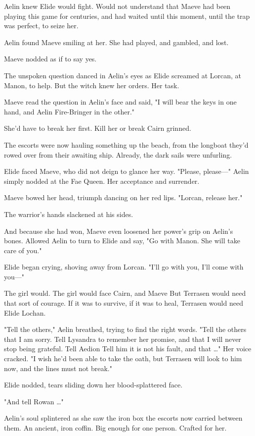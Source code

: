 Aelin knew Elide would fight. Would not understand that Maeve had been playing this game for centuries, and had waited until this moment, until the trap was perfect, to seize her.

Aelin found Maeve smiling at her. She had played, and gambled, and lost.

Maeve nodded as if to say yes.

The unspoken question danced in Aelin's eyes as Elide screamed at Lorcan, at Manon, to help. But the witch knew her orders. Her task.

Maeve read the question in Aelin's face and said, "I will bear the keys in one hand, and Aelin Fire-Bringer in the other."

She'd have to break her first. Kill her or break  Cairn grinned.

The escorts were now hauling something up the beach, from the longboat they'd rowed over from their awaiting ship. Already, the dark sails were unfurling.

Elide faced Maeve, who did not deign to glance her way. "Please, please---" Aelin simply nodded at the Fae Queen. Her acceptance and surrender.

Maeve bowed her head, triumph dancing on her red lips. "Lorcan, release her."

The warrior's hands slackened at his sides.

And because she had won, Maeve even loosened her power's grip on Aelin's bones. Allowed Aelin to turn to Elide and say, "Go with Manon. She will take care of you."

Elide began crying, shoving away from Lorcan. "I'll go with you, I'll come with you---"

The girl would. The girl would face Cairn, and Maeve  But Terrasen would need that sort of courage. If it was to survive, if it was to heal, Terrasen would need Elide Lochan.

"Tell the others," Aelin breathed, trying to find the right words. "Tell the others that I am sorry. Tell Lysandra to remember her promise, and that I will never stop being grateful. Tell Aedion 
Tell him it is not his fault, and that \ldots" Her voice cracked. "I wish he'd been able to take the oath, but Terrasen will look to him now, and the lines must not break."

Elide nodded, tears sliding down her blood-splattered face.

"And tell Rowan \ldots"

Aelin's soul splintered as she saw the iron box the escorts now carried between them. An ancient, iron coffin. Big enough for one person. Crafted for her.

